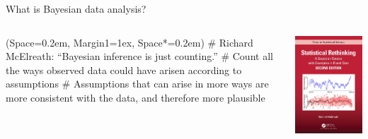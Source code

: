 \documentclass[12pt, aspectratio=149]{beamer}
\newcommand{\listSpace}{0.2em}
\theoremstyle{plain}
\begin{document}
\begin{frame}[fragile]{What is Bayesian data analysis?}
	\begin{columns}
		\begin{column}{0.7\linewidth}
			\begin{easylist}
					\ListProperties(Space=\listSpace, Margin1=1ex, Space*=\listSpace)
					# Richard McElreath: ``Bayesian inference is just counting.''  
					# Count all the ways observed data could have arisen according to assumptions
					# Assumptions that can arise in more ways are more consistent with the data, and therefore more plausible
			\end{easylist}
		\end{column}
	\begin{column}{0.3\textwidth}
		\includegraphics[height=0.7\textheight]{figs/rethinking3.jpg}
	\end{column}
	\end{columns}
\end{frame}
\end{document}
